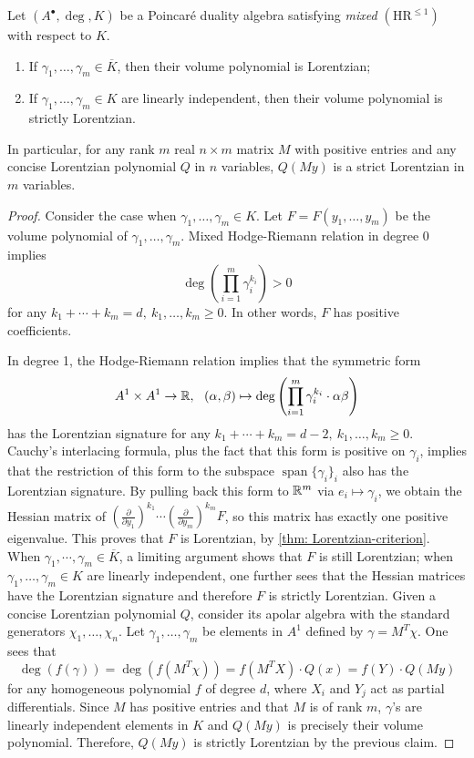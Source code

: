 \begin{proposition}\label{prop: strictification}
   Let $(A^\bullet,\deg,K)$ be a Poincar\'e duality algebra satisfying \textit{mixed $(\mathrm{HR}^{\leq 1})$} with respect to $K$.
   \begin{enumerate}
   \item If $\gamma_1,\ldots,\gamma_m\in\overline{K}$, then their volume polynomial is Lorentzian;
   \item If $\gamma_1,\ldots,\gamma_m\in K$ are linearly independent, then their volume polynomial is strictly Lorentzian.
   \end{enumerate}
   In particular, for any rank $m$ real $n\times m$ matrix $M$ with positive entries and any concise Lorentzian polynomial $Q$ in $n$ variables, $Q(My)$ is a strict Lorentzian in $m$ variables.
\end{proposition}
\begin{proof}
    Consider the case when $\gamma_1,\ldots,\gamma_m\in K$. Let $F=F(y_1,\ldots,y_m)$ be the volume polynomial of $\gamma_1,\ldots,\gamma_m$. Mixed Hodge-Riemann relation in degree 0 implies
\[
    \deg\!\left(\prod_{i=1}^m\gamma_i^{k_i}\right)>0
\]
for any $k_1+\cdots+k_m=d,\ k_1,\ldots,k_m\geq 0$. In other words, $F$ has positive coefficients.

In degree 1, the Hodge-Riemann relation implies that the symmetric form
\[
    A^1\times A^1 \to \R, \ \ (\alpha,\beta)\mapsto \deg\left(\prod_{i=1}^m\gamma_i^{k_i}\cdot \alpha\beta\right) 
\]
has the Lorentzian signature for any $k_1+\cdots +k_m=d-2,\ k_1,\ldots,k_m\geq 0$. Cauchy's interlacing formula, plus the fact that this form is positive on $\gamma_i$, implies that the restriction of this form to the subspace $\operatorname{span}\{ \gamma_i\}_i$ also has the Lorentzian signature. By pulling back this form to $\mathbb{R}^m$ via $e_i\mapsto\gamma_i$, we obtain the Hessian matrix of $\left(\frac{\partial}{\partial y_1}\right)^{k_1}\cdots\left(\frac{\partial}{\partial y_m}\right)^{k_m}F$, so this matrix has exactly one positive eigenvalue. This proves that $F$ is Lorentzian, by \ref{thm: Lorentzian-criterion}.
When $\gamma_1,\cdots,\gamma_m\in \overline{K}$, a limiting argument shows that $F$ is still Lorentzian; when $\gamma_1,\ldots,\gamma_m\in K$ are linearly independent, one further sees that the Hessian matrices have the Lorentzian signature and therefore $F$ is strictly Lorentzian.
    Given a concise Lorentzian polynomial $Q$, consider its apolar algebra with the standard generators $\chi_1,\ldots,\chi_n$. Let $\gamma_1,\ldots,\gamma_m$ be elements in $A^1$ defined by $\gamma=M^T\chi$. One sees that 
    \[
    \deg(f(\gamma))=\deg(f(M^T\chi))=f(M^TX)\cdot Q(x)=f(Y)\cdot Q(My)
    \]
    for any homogeneous polynomial $f$ of degree $d$, where $X_i$ and $Y_j$ act as partial differentials. Since $M$ has positive entries and that $M$ is of rank $m$, $\gamma$'s are linearly independent elements in $K$ and $Q(My)$ is precisely their volume polynomial. Therefore, $Q(My)$ is strictly Lorentzian by the previous claim.



\end{proof}

